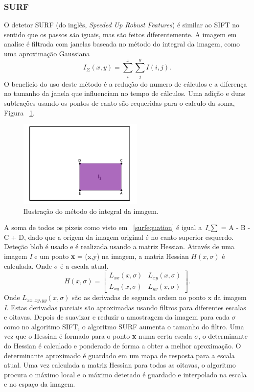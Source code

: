 \subsubsection{SURF}

O detetor SURF (do inglês, \textit{Speeded Up Robust Features}) é similar ao SIFT no sentido que os passos são iguais, mas são feitos diferentemente. A imagem em analise é filtrada com janelas baseada no método do integral da imagem, como uma aproximação Gaussiana \begin{equation}\label{surfequation}
 I_{\Sigma}(x,y) = \sum_{i}^{x}\sum_{j}^{y}{I(i,j)}. \end{equation}
O beneficio do uso deste método é a redução do numero de cálculos e a diferença no tamanho da janela que influenciam no tempo de cálculos. Uma adição e duas subtrações usando os pontos de canto são requeridas para o calculo da soma, Figura ~\ref{fig:surfsqware}.

\begin{figure}[h!]
	\centering
	\includegraphics[width=0.4\linewidth]{figures/surfsqware}
	\caption{Ilustração do método do integral da imagem. \cite{VisualOdometryRodasVehicles}}
	\label{fig:surfsqware}
\end{figure}

A soma de todos os pixeis como visto em ~\ref{surfequation} é igual a $\textit{I_{$\sum$}}$ = A - B - C + D, dado que a origem da imagem original é no canto superior esquerdo. Deteção blob é usado e é realizada usando a matriz Hessian. Através de uma imagem \textit{I} e um ponto \textbf{x} = (x,y) na imagem, a matriz Hessian $\textit{H}(x,\sigma)$ é calculada. Onde $\sigma$ é a escala atual. \[  \textit{H}(x,\sigma) = \left[ \begin{array}{cc}
L_{xx}(x,\sigma) & L_{xy}(x,\sigma) \\ 
L_{xy}(x,\sigma) & L_{yy}(x,\sigma)
\end{array} \right]. \] 
Onde $\textit{L}_{xx,xy,yy}(x,\sigma)$  são as derivadas de segunda ordem no ponto x da imagem \textit{I}. Estas derivadas parciais são aproximadas usando filtros para diferentes escalas e oitavas. Depois de suavizar e reduzir a amostragem da imagem para cada $\sigma$ como no algoritmo SIFT, o algoritmo SURF aumenta o tamanho do filtro. Uma vez que o Hessian é formado para o ponto \textbf{x} numa certa escala $\sigma$, o determinante do Hessian é calculado e ponderado de forma a obter a melhor aproximação.  O determinante aproximado é guardado em um mapa de resposta para a escala atual.
Uma vez calculada a matriz Hessian para todas as oitavas, o algoritmo procura o máximo local e o máximo detetado é guardado e interpolado na escala e no espaço da imagem. 

